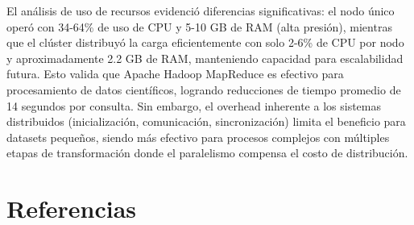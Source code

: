 \documentclass[12pt,a4paper]{article}
\begin{document}
El análisis de uso de recursos evidenció diferencias significativas: el nodo único operó con 34-64\% de uso de CPU y 5-10 GB de RAM (alta presión), mientras que el clúster distribuyó la carga eficientemente con solo 2-6\% de CPU por nodo y aproximadamente 2.2 GB de RAM, manteniendo capacidad para escalabilidad futura. Esto valida que Apache Hadoop MapReduce es efectivo para procesamiento de datos científicos, logrando reducciones de tiempo promedio de 14 segundos por consulta. Sin embargo, el overhead inherente a los sistemas distribuidos (inicialización, comunicación, sincronización) limita el beneficio para datasets pequeños, siendo más efectivo para procesos complejos con múltiples etapas de transformación donde el paralelismo compensa el costo de distribución.

\vspace{1cm}

\newpage
\section*{Referencias}
\end{document}
